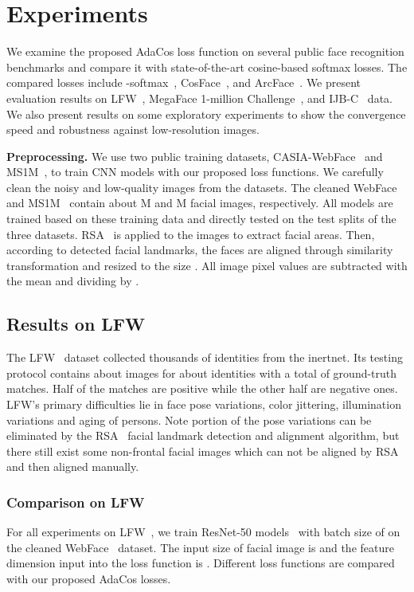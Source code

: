 \documentclass[10pt,twocolumn,letterpaper]{article}
\begin{document}
\section{Experiments}
We examine the proposed AdaCos loss function on several public face recognition benchmarks and compare it with state-of-the-art cosine-based softmax losses. The compared losses include -softmax~\cite{L2-softmax}, CosFace~\cite{CosFace}, and ArcFace~\cite{ArcFace}. We present evaluation results on LFW~\cite{LFW}, MegaFace 1-million Challenge~\cite{MegaFace1}, and IJB-C~\cite{ijbc} data. We also present results on some exploratory experiments to show the convergence speed and robustness against low-resolution images.


\textbf{Preprocessing.} We use two public training datasets, CASIA-WebFace~\cite{WebFace} and MS1M~\cite{MS-Celeb-1M}, to train CNN models with our proposed loss functions. We carefully clean the noisy and low-quality images from the datasets. The cleaned WebFace~\cite{WebFace} and MS1M~\cite{MS-Celeb-1M} contain about M and M facial images, respectively. All models are trained based on these training data and directly tested on the test splits of the three datasets. RSA~\cite{liu_2017_rsa} is applied to the images to extract facial areas. Then, according to detected facial landmarks, the faces are aligned through similarity transformation and resized to the size . All image pixel values are subtracted with the mean  and dividing by .



\subsection{Results on LFW}
The LFW~\cite{LFW} dataset collected thousands of identities from the inertnet. Its testing protocol contains about  images for about  identities with a total of  ground-truth matches. Half of the matches are positive while the other half are negative ones. LFW's primary difficulties lie in face pose variations, color jittering, illumination variations and aging of persons. Note portion of the pose variations can be eliminated by the RSA~\cite{liu_2017_rsa} facial landmark detection and alignment algorithm, but there still exist some non-frontal facial images which can not be aligned by RSA~\cite{liu_2017_rsa} and then aligned manually.

\subsubsection{Comparison on LFW}
For all experiments on LFW~\cite{LFW}, we train ResNet-50 models~\cite{he2016deep} with batch size of  on the cleaned WebFace~\cite{WebFace} dataset. The input size of facial image is  and the feature dimension input into the loss function is . Different loss functions are compared with our proposed AdaCos losses.
\end{document}
